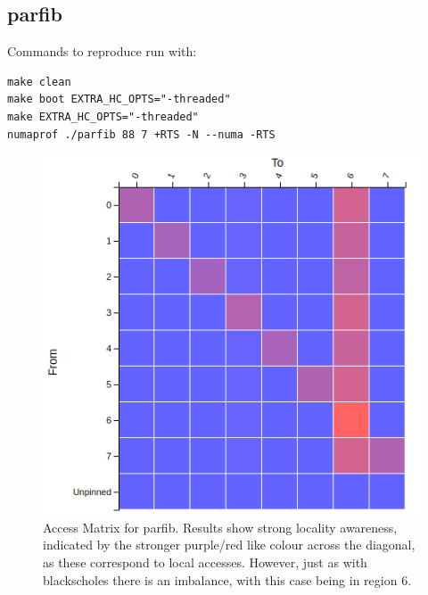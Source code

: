 \documentclass[a4paper,11pt]{article}
\begin{document}
\subsection{parfib}

Commands to reproduce run with:
\begin{lstlisting}
make clean
make boot EXTRA_HC_OPTS="-threaded"
make EXTRA_HC_OPTS="-threaded"
numaprof ./parfib 88 7 +RTS -N --numa -RTS
\end{lstlisting}

\begin{figure}[!htb]
    \centering
    \includegraphics[width=0.5\linewidth]{TechMemo/results/parfib/parfib_access.png}
    \caption{Access Matrix for parfib. Results show strong locality awareness, indicated by the stronger purple/red like colour across the diagonal, as these correspond to local accesses. However, just as with blackscholes there is an imbalance, with this case being in region 6.}
    \label{fig:parfib_access_matrix}
\end{figure}
\end{document}

